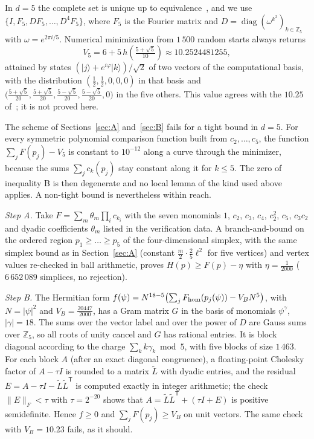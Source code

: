 \documentclass[11pt,a4paper]{article}
\theoremstyle{plain}
\DeclareMathOperator{\diag}{diag}
\newcommand{\Z}{\mathbb Z}
\newcommand{\ket}[1]{\lvert#1\rangle}
\begin{document}
In $d=5$ the complete set is unique up to equivalence~\cite{BWB2010}, and we use
$\{I,F_5,DF_5,\dots,D^4F_5\}$, where $F_5$ is the Fourier matrix and
$D=\diag(\omega^{k^2})_{k\in\Z_5}$ with $\omega=e^{2\pi i/5}$. Numerical
minimization from $1\,500$ random starts always returns
\begin{equation}
  V_5=6+5\,h\!\left(\tfrac{5+\sqrt5}{10}\right)\approx10.2524481255,
\end{equation}
attained by states $(\ket{j}+e^{i\varphi}\ket{k})/\sqrt2$ of two vectors of the
computational basis, with the distribution $(\tfrac12,\tfrac12,0,0,0)$ in that
basis and
$\bigl(\tfrac{5+\sqrt5}{20},\tfrac{5+\sqrt5}{20},\tfrac{5-\sqrt5}{20},\tfrac{5-\sqrt5}{20},0\bigr)$
in the five others. This value agrees with the $10.25$ of~\cite{RMM2017}; it is
not proved here.

The scheme of Sections~\ref{sec:A} and~\ref{sec:B} fails for a tight bound in
$d=5$. For every symmetric polynomial comparison function built from
$c_2,\dots,c_5$, the function $\sum_jF(p_j)-V_5$ is constant to $10^{-12}$
along a curve through the minimizer, because the sums $\sum_jc_k(p_j)$ stay
constant along it for $k\le5$. The zero of inequality B is then degenerate and
no local lemma of the kind used above applies. A non-tight bound is
nevertheless within reach.

\emph{Step A.} Take
$F=\sum_m\theta_m\prod_ic_{k_i}$ with the seven monomials $1$, $c_2$, $c_3$,
$c_4$, $c_2^2$, $c_5$, $c_3c_2$ and dyadic coefficients $\theta_m$ listed in
the verification data. A branch-and-bound on the ordered region
$p_1\ge\dots\ge p_5$ of the four-dimensional simplex, with the same simplex
bound as in Section~\ref{sec:A} (constant $\frac m2\cdot\frac25\ell^2$ for five
vertices) and vertex values re-checked in ball arithmetic, proves
$H(p)\ge F(p)-\eta$ with $\eta=\frac1{2000}$ ($6\,652\,089$ simplices, no
rejection).

\emph{Step B.} The Hermitian form
$f(\psi)=N^{18-5}\bigl(\sum_jF_{\rm hom}(p_j(\psi))-V_BN^{5}\bigr)$, with
$N=|\psi|^2$ and $V_B=\frac{20447}{2000}$, has a Gram matrix $G$ in the basis
of monomials $\psi^\gamma$, $|\gamma|=18$. The sums over the vector label and
over the power of $D$ are Gauss sums over $\Z_5$, so all roots of unity
cancel and $G$ has rational entries. It is block diagonal according to the
charge $\sum_kk\gamma_k\bmod5$, with five blocks of size $1\,463$. For each
block $A$ (after an exact diagonal congruence), a floating-point Cholesky
factor of $A-\tau I$ is rounded to a matrix $\tilde L$ with dyadic entries, and
the residual $E=A-\tau I-\tilde L\tilde L^{\mathsf T}$ is computed exactly in
integer arithmetic; the check $\|E\|_F<\tau$ with $\tau=2^{-20}$ shows that
$A=\tilde L\tilde L^{\mathsf T}+(\tau I+E)$ is positive semidefinite. Hence
$f\ge0$ and $\sum_jF(p_j)\ge V_B$ on unit vectors. The same check with
$V_B=10.23$ fails, as it should.
\end{document}

